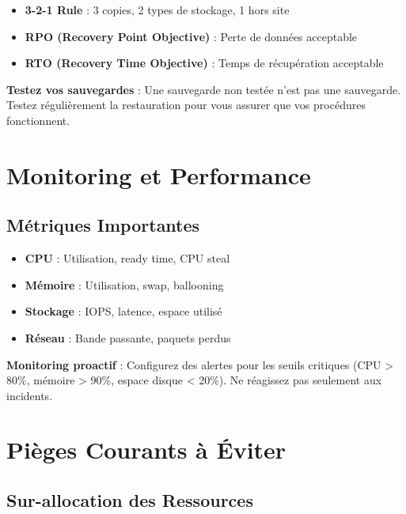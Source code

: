 \documentclass[11pt,a4paper]{article}
\begin{document}
\begin{itemize}
    \item \textbf{3-2-1 Rule} : 3 copies, 2 types de stockage, 1 hors site
    \item \textbf{RPO (Recovery Point Objective)} : Perte de données acceptable
    \item \textbf{RTO (Recovery Time Objective)} : Temps de récupération acceptable
\end{itemize}

\begin{importantbox}
\textbf{Testez vos sauvegardes} : Une sauvegarde non testée n'est pas une sauvegarde. Testez régulièrement la restauration pour vous assurer que vos procédures fonctionnent.
\end{importantbox}

\section{Monitoring et Performance}

\subsection{Métriques Importantes}

\begin{itemize}
    \item \textbf{CPU} : Utilisation, ready time, CPU steal
    \item \textbf{Mémoire} : Utilisation, swap, ballooning
    \item \textbf{Stockage} : IOPS, latence, espace utilisé
    \item \textbf{Réseau} : Bande passante, paquets perdus
\end{itemize}

\begin{tipbox}
\textbf{Monitoring proactif} : Configurez des alertes pour les seuils critiques (CPU > 80\%, mémoire > 90\%, espace disque < 20\%). Ne réagissez pas seulement aux incidents.
\end{tipbox}

\section{Pièges Courants à Éviter}

\subsection{Sur-allocation des Ressources}
\end{document}

